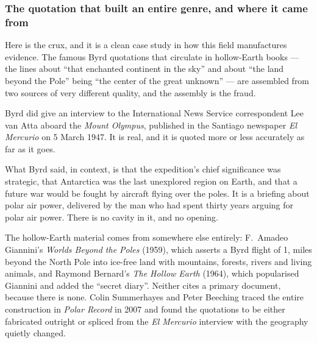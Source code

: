 \Needspace*{0.40\textheight}
\subsubsection*{The quotation that built an entire genre, and where it came from}
Here is the crux, and it is a clean case study in how this field manufactures evidence. The famous
Byrd quotations that circulate in hollow-Earth books --- the lines about ``that enchanted continent
in the sky'' and about ``the land beyond the Pole'' being ``the center of the great unknown'' --- are
assembled from two sources of very different quality, and the assembly is the fraud.

Byrd did give an interview to the International News Service correspondent Lee van Atta aboard the
\emph{Mount Olympus}, published in the Santiago newspaper \emph{El Mercurio} on 5 March 1947. It is
real, and it is quoted more or less accurately as far as it goes.


What Byrd said, in context, is that the expedition's chief significance was strategic, that
Antarctica was the last unexplored region on Earth, and that a future war would be fought by
aircraft flying over the poles. It is a briefing about polar air power, delivered by the man who had
spent thirty years arguing for polar air power. There is no cavity in it, and no opening.

The hollow-Earth material comes from somewhere else entirely: F.\ Amadeo Giannini's \emph{Worlds
Beyond the Poles} (1959), which asserts a Byrd flight of 1, miles beyond the North Pole into
ice-free land with mountains, forests, rivers and living animals, and Raymond Bernard's \emph{The
Hollow Earth} (1964), which popularised Giannini and added the ``secret diary''. Neither cites a
primary document, because there is none.  Colin Summerhayes and Peter Beeching traced the
entire construction in \emph{Polar Record} in 2007 and found the quotations to be either fabricated
outright or spliced from the \emph{El Mercurio} interview with the geography quietly changed.

